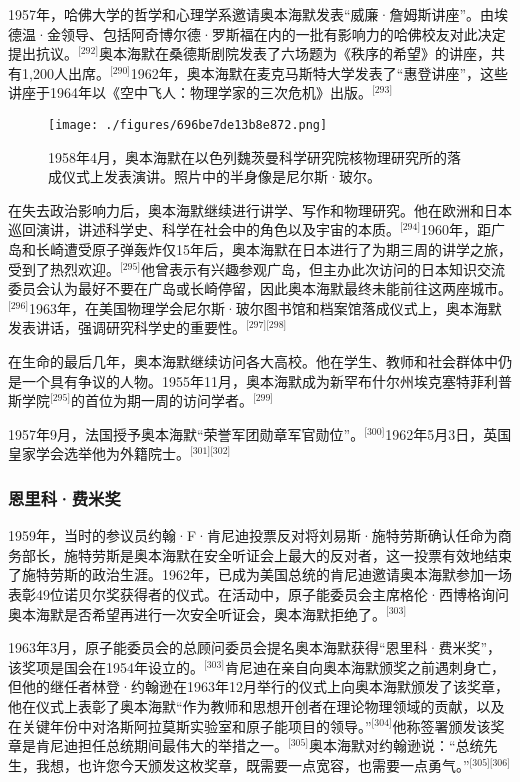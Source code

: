1957年，哈佛大学的哲学和心理学系邀请奥本海默发表“威廉·詹姆斯讲座”。由埃德温·金领导、包括阿奇博尔德·罗斯福在内的一批有影响力的哈佛校友对此决定提出抗议。\(^\text{[292]}\)奥本海默在桑德斯剧院发表了六场题为《秩序的希望》的讲座，共有1,200人出席。\(^\text{[290]}\)1962年，奥本海默在麦克马斯特大学发表了“惠登讲座”，这些讲座于1964年以《空中飞人：物理学家的三次危机》出版。\(^\text{[293]}\)
\begin{figure}[ht]
\centering
\texttt{[image: ./figures/696be7de13b8e872.png]}
\caption{1958年4月，奥本海默在以色列魏茨曼科学研究院核物理研究所的落成仪式上发表演讲。照片中的半身像是尼尔斯·玻尔。} \label{fig_ABHM_14}
\end{figure}
在失去政治影响力后，奥本海默继续进行讲学、写作和物理研究。他在欧洲和日本巡回演讲，讲述科学史、科学在社会中的角色以及宇宙的本质。\(^\text{[294]}\)1960年，距广岛和长崎遭受原子弹轰炸仅15年后，奥本海默在日本进行了为期三周的讲学之旅，受到了热烈欢迎。\(^\text{[295]}\)他曾表示有兴趣参观广岛，但主办此次访问的日本知识交流委员会认为最好不要在广岛或长崎停留，因此奥本海默最终未能前往这两座城市。\(^\text{[296]}\)1963年，在美国物理学会尼尔斯·玻尔图书馆和档案馆落成仪式上，奥本海默发表讲话，强调研究科学史的重要性。\(^\text{[297][298]}\)

在生命的最后几年，奥本海默继续访问各大高校。他在学生、教师和社会群体中仍是一个具有争议的人物。1955年11月，奥本海默成为新罕布什尔州埃克塞特菲利普斯学院\(^\text{[295]}\)的首位为期一周的访问学者。\(^\text{[299]}\)

1957年9月，法国授予奥本海默“荣誉军团勋章军官勋位”。\(^\text{[300]}\)1962年5月3日，英国皇家学会选举他为外籍院士。\(^\text{[301][302]}\)
\subsubsection{恩里科·费米奖}
1959年，当时的参议员约翰·F·肯尼迪投票反对将刘易斯·施特劳斯确认任命为商务部长，施特劳斯是奥本海默在安全听证会上最大的反对者，这一投票有效地结束了施特劳斯的政治生涯。1962年，已成为美国总统的肯尼迪邀请奥本海默参加一场表彰49位诺贝尔奖获得者的仪式。在活动中，原子能委员会主席格伦·西博格询问奥本海默是否希望再进行一次安全听证会，奥本海默拒绝了。\(^\text{[303]}\)

1963年3月，原子能委员会的总顾问委员会提名奥本海默获得“恩里科·费米奖”，该奖项是国会在1954年设立的。\(^\text{[303]}\)肯尼迪在亲自向奥本海默颁奖之前遇刺身亡，但他的继任者林登·约翰逊在1963年12月举行的仪式上向奥本海默颁发了该奖章，他在仪式上表彰了奥本海默“作为教师和思想开创者在理论物理领域的贡献，以及在关键年份中对洛斯阿拉莫斯实验室和原子能项目的领导。”\(^\text{[304]}\)他称签署颁发该奖章是肯尼迪担任总统期间最伟大的举措之一。\(^\text{[305]}\)奥本海默对约翰逊说：“总统先生，我想，也许您今天颁发这枚奖章，既需要一点宽容，也需要一点勇气。”\(^\text{[305][306]}\)

